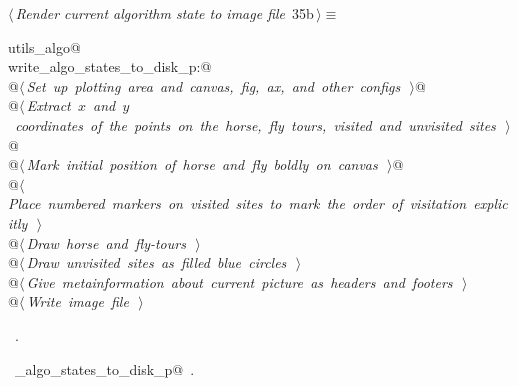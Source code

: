 \documentclass[11.5pt]{report}
\begin{document}
\begin{flushleft} \small\label{scrap42}\raggedright\small
{} $\langle\,${\itshape Render current algorithm state to image file}\nobreak\ {\footnotesize {35b}}$\,\rangle\equiv$
\vspace{-1ex}
\begin{list}{}{} \item
\mbox{}\verb@import utils_algo@\\
\mbox{}\verb@if write_algo_states_to_disk_p:@\\
\mbox{}\verb@     @\hbox{$\langle\,${\itshape Set up plotting area and canvas, fig, ax, and other configs}\nobreak\ {\footnotesize {}}$\,\rangle$}\verb@  @\\
\mbox{}\verb@     @\hbox{$\langle\,${\itshape Extract $x$ and $y$ coordinates of the points on the horse, fly tours, visited and unvisited sites}\nobreak\ {\footnotesize {}}$\,\rangle$}\verb@  @\\
\mbox{}\verb@     @\hbox{$\langle\,${\itshape Mark initial position of horse and fly boldly on canvas}\nobreak\ {\footnotesize {}}$\,\rangle$}\verb@  @\\
\mbox{}\verb@     @\hbox{$\langle\,${\itshape Place numbered markers on visited sites to mark the order of visitation explicitly}\nobreak\ {\footnotesize {}}$\,\rangle$}\verb@@\\
\mbox{}\verb@     @\hbox{$\langle\,${\itshape Draw horse and fly-tours}\nobreak\ {\footnotesize {}}$\,\rangle$}\verb@@\\
\mbox{}\verb@     @\hbox{$\langle\,${\itshape Draw unvisited sites as filled blue circles}\nobreak\ {\footnotesize {}}$\,\rangle$}\verb@@\\
\mbox{}\verb@     @\hbox{$\langle\,${\itshape Give metainformation about current picture as headers and footers}\nobreak\ {\footnotesize {}}$\,\rangle$}\verb@@\\
\mbox{}\verb@     @\hbox{$\langle\,${\itshape Write image file}\nobreak\ {\footnotesize {}}$\,\rangle$}\verb@@\\
\mbox{}\verb@@{\NWsep}
\end{list}
\vspace{-1.5ex}
\footnotesize
\begin{list}{}{\setlength{\itemsep}{-\parsep}\setlength{\itemindent}{-\leftmargin}}
\item \NWtxtMacroRefIn\ .
\item \NWtxtIdentsUsed\nobreak\  \verb@write_algo_states_to_disk_p@\nobreak\ .
\item{}
\end{list}
\vspace{4ex}
\end{flushleft}
\end{document}
